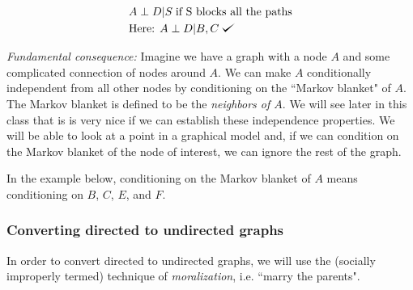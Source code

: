 \documentclass{article}
\def\checkmark{\tikz\fill[scale=0.4](0,.35) -- (.25,0) -- (1,.7) -- (.25,.15) -- cycle;}
\begin{document}
\begin{align}
&A \perp D|S \; \text{if S blocks all the paths} \\
&\text{Here: } A \perp D|B,C \; \checkmark
\end{align}

\emph{Fundamental consequence:} Imagine we have a graph with a node $A$ and some complicated connection of nodes around $A$. 
We can make $A$ conditionally independent from all other nodes by conditioning on the ``Markov blanket" of $A$.
The Markov blanket is defined to be the \emph{neighbors of $A$}.
We will see later in this class that is is very nice if we can establish these independence properties.
We will be able to look at a point in a graphical model and, if we can condition on the Markov blanket of the node of interest, we can ignore the rest of the graph.
\smallskip

In the example below, conditioning on the Markov blanket of $A$ means conditioning on $B$, $C$, $E$, and $F$.

\begin{center}
\end{center}


\subsubsection{Converting directed to undirected graphs}

In order to convert directed to undirected graphs, we will use the (socially improperly termed) technique of \textit{moralization}, i.e. ``marry the parents".
\smallskip
\end{document}
